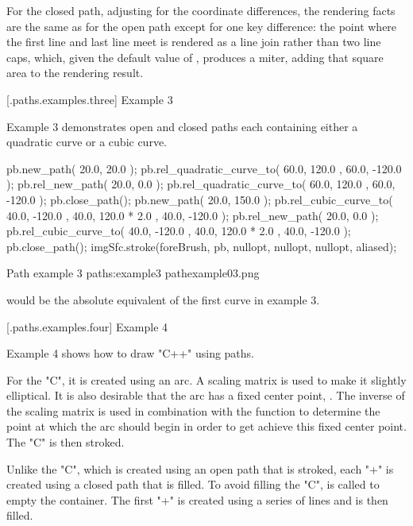 \pnum
For the closed path, adjusting for the coordinate differences, the rendering facts are the same as for the open path except for one key difference: the point where the first line and last line meet is rendered as a line join rather than two line caps, which, given the default value of , produces a miter, adding that square area to the rendering result.

 [\iotwod.paths.examples.three] {Example 3}

\pnum
Example 3 demonstrates open and closed paths each containing either a quadratic curve or a cubic curve.

\begin{codeblock}
pb.new_path({ 20.0, 20.0 });
pb.rel_quadratic_curve_to({ 60.0, 120.0 }, { 60.0, -120.0 });
pb.rel_new_path({ 20.0, 0.0 });
pb.rel_quadratic_curve_to({ 60.0, 120.0 }, { 60.0, -120.0 });
pb.close_path();
pb.new_path({ 20.0, 150.0 });
pb.rel_cubic_curve_to({ 40.0, -120.0 }, { 40.0, 120.0 * 2.0 },
  { 40.0, -120.0 });
pb.rel_new_path({ 20.0, 0.0 });
pb.rel_cubic_curve_to({ 40.0, -120.0 }, { 40.0, 120.0 * 2.0 },
  { 40.0, -120.0 });
pb.close_path();
imgSfc.stroke(foreBrush, pb, nullopt, nullopt, nullopt, aliased);
\end{codeblock}

\begin{importgraphiciotwod}
{Path example 3}
{paths:example3}
{pathexample03.png}
\end{importgraphiciotwod}

\FloatBarrier

\pnum
\begin{note}
 would be the absolute equivalent of the first curve in example 3.
\end{note}

 [\iotwod.paths.examples.four] {Example 4}

\pnum
Example 4 shows how to draw "C++" using paths.

\pnum
For the "C", it is created using an arc. A scaling matrix is used to make it  slightly elliptical. It is also desirable that the arc has a fixed center point, . The inverse of the scaling matrix is used in combination with the  function to determine the point at which the arc should begin in order to get achieve this fixed center point. The "C" is then stroked.

\pnum
Unlike the "C", which is created using an open path that is stroked, each "+" is created using a closed path that is filled. To avoid filling the "C",  is called to empty the container. The first "+" is created using a series of lines and is then filled.

